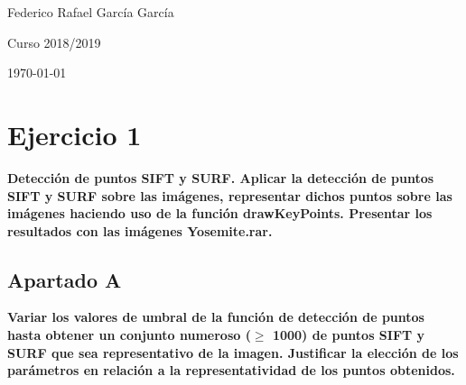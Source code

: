 \documentclass[12pt,spanish]{article} %
\begin{document}
\begin{titlepage}
\vspace{0.75cm}

\large Federico Rafael García García

\large Curso 2018/2019



{\today} %


\vfill %

\end{titlepage}


\tableofcontents %

\newpage %



\pagestyle{fancy}

\section{Ejercicio 1}


\textbf{
Detección de puntos SIFT y SURF. Aplicar la detección de puntos SIFT y SURF sobre las imágenes, representar dichos puntos sobre
las imágenes haciendo uso de la función drawKeyPoints. Presentar los resultados con las imágenes Yosemite.rar.
}


\subsection{Apartado A}

\textbf{
Variar los valores de umbral de la función de detección de puntos hasta obtener un conjunto numeroso ($\geq$ 1000) de puntos SIFT y SURF que sea representativo de la imagen. Justificar la elección de los parámetros en relación a la representatividad de los puntos obtenidos.
}
\end{document}
